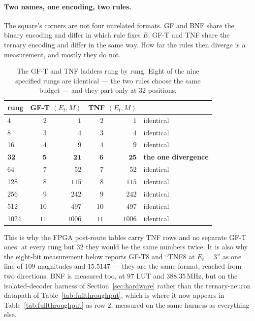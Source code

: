 \paragraph{Two names, one encoding, two rules.} The square's corners are not
four unrelated formats. GF and BNF share the binary encoding and differ in which
rule fixes $E$; GF-T and TNF share the ternary encoding and differ in the same
way. How far the rules then diverge is a measurement, and mostly they do not.

\begin{table}[t]\centering
\caption{The GF-T and TNF ladders rung by rung. Eight of the nine specified
rungs are identical --- the two rules choose the same budget --- and they part
only at 32 positions.}
\label{tab:gftvstnf}
\begin{tabular}{lrrrrl}
\toprule
rung & \multicolumn{2}{c}{GF-T $(E_t, M)$} & \multicolumn{2}{c}{TNF $(E_t, M)$} & \\
\midrule
4    & $2$ & $1$    & $2$ & $1$    & identical \\
8    & $3$ & $4$    & $3$ & $4$    & identical \\
16   & $4$ & $9$    & $4$ & $9$    & identical \\
\textbf{32} & $\mathbf{5}$ & $\mathbf{21}$ & $\mathbf{6}$ & $\mathbf{25}$ & \textbf{the one divergence} \\
64   & $7$ & $52$   & $7$ & $52$   & identical \\
128  & $8$ & $115$  & $8$ & $115$  & identical \\
256  & $9$ & $242$  & $9$ & $242$  & identical \\
512  & $10$ & $497$ & $10$ & $497$ & identical \\
1024 & $11$ & $1006$& $11$ & $1006$& identical \\
\bottomrule
\end{tabular}
\end{table}

This is why the FPGA post-route tables carry TNF rows and no separate GF-T ones: at
every rung but 32 they would be the same numbers twice. It is also why the
eight-bit measurement below reports GF-T8 and ``TNF8 at $E_t=3$'' as one line
of $109$ magnitudes and $15.5147$ --- they are the same format, reached from two
directions. BNF is measured too, at $97$ LUT and $388.35$\,MHz, but on the
isolated-decoder harness of Section~\ref{sec:hardware} rather than the
ternary-neuron datapath of Table~\ref{tab:fullthroughput}, which is where
it now appears in Table~\ref{tab:fullthroughput} as row 2, measured on the
same harness as everything else.

